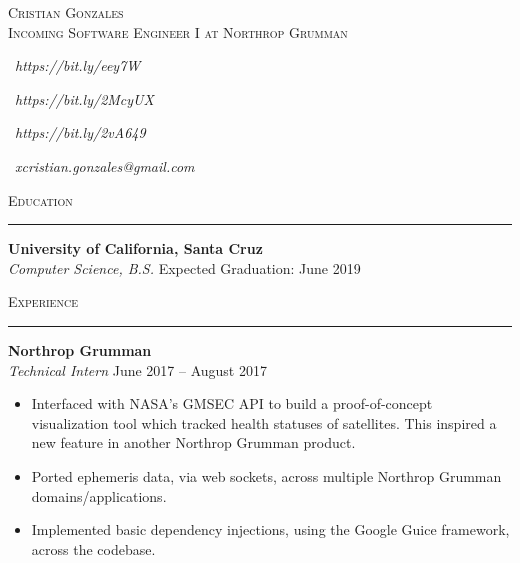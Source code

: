 \documentclass{res}
\begin{document}
\begin{resume}

\begin{center}
\textsc{{\Huge Cristian Gonzales}}\\
\vspace{1mm}
\textsc{\large Incoming Software Engineer I at Northrop Grumman}\\
\vspace{1mm}
\end{center}

\begin{multicols}{4}
\begin{center}
\faLinkedinSquare\ 
\textit{https://bit.ly/eey7W}
\end{center}
\columnbreak
\begin{center}
\faGithub\ 
\textit{https://bit.ly/2McyUX}
\end{center}
\columnbreak
\begin{center}
\faGlobe\ 
\textit{https://bit.ly/2vA649}
\end{center}
\columnbreak
\faEnvelope\ 
\textit{xcristian.gonzales@gmail.com}
\end{multicols}

\vspace{-3mm}

\textsc{{\Large Education}}
\vspace{0.5mm}
\hrule width18.5cm
\textbf{University of California, Santa Cruz}\\
\textit{Computer Science, B.S.}
\hfill
Expected Graduation: June 2019\\
\vspace{-4mm}

\textsc{{\Large Experience}}
\vspace{0.5mm}
\hrule width18.5cm
\textbf{Northrop Grumman}\\
\textit{Technical Intern}
\hfill
June 2017 -- August 2017\\[1mm]
	\begin{itemize}
		\vspace{-3mm}
		\item Interfaced with NASA's GMSEC API to build a proof-of-concept visualization tool which tracked health statuses of satellites. This inspired a new feature in another Northrop Grumman product.
		\item Ported ephemeris data, via web sockets, across multiple Northrop Grumman domains/applications.
		\item Implemented basic dependency injections, using the Google Guice framework, across the codebase.
	\end{itemize}


\end{resume}
\end{document}
